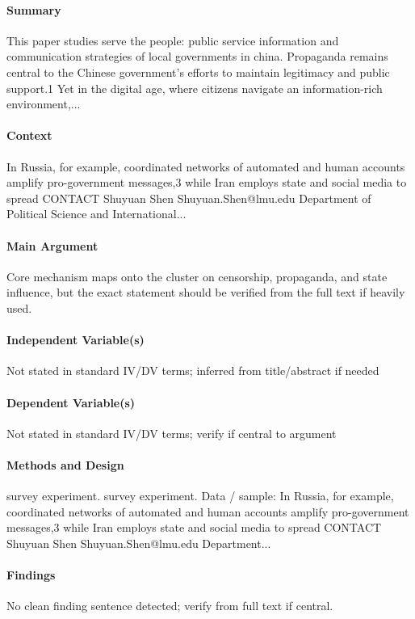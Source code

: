 \documentclass[12pt]{article}
\begin{document}
\paragraph{Summary} This paper studies serve the people: public service information and communication strategies of local governments in china. Propaganda remains central to the Chinese government's efforts to maintain legitimacy and public support.1 Yet in the digital age, where citizens navigate an information-rich environment,...

\paragraph{Context} In Russia, for example, coordinated networks of automated and human accounts amplify pro-government messages,3 while Iran employs state and social media to spread CONTACT Shuyuan Shen Shuyuan.Shen@lmu.edu Department of Political Science and International...

\paragraph{Main Argument} Core mechanism maps onto the cluster on censorship, propaganda, and state influence, but the exact statement should be verified from the full text if heavily used.

\paragraph{Independent Variable(s)} Not stated in standard IV/DV terms; inferred from title/abstract if needed

\paragraph{Dependent Variable(s)} Not stated in standard IV/DV terms; verify if central to argument

\paragraph{Methods and Design} survey experiment. survey experiment. Data / sample: In Russia, for example, coordinated networks of automated and human accounts amplify pro-government messages,3 while Iran employs state and social media to spread CONTACT Shuyuan Shen Shuyuan.Shen@lmu.edu Department...

\paragraph{Findings} No clean finding sentence detected; verify from full text if central.
\end{document}
